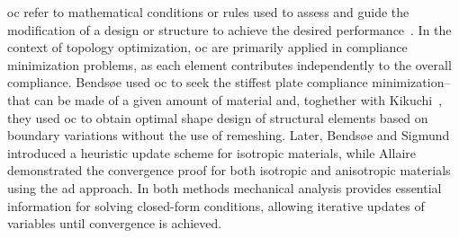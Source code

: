 \gls{oc} refer to mathematical conditions or rules used to assess and guide the modification of a design or structure to achieve the desired performance~. In the context of topology optimization, \gls{oc} are primarily applied in compliance minimization problems, as each element contributes independently to the overall compliance. Bendsøe used \gls{oc} to seek the stiffest plate \ie compliance minimization--that can be made of a given amount of material and, toghether with Kikuchi~, they used \gls{oc} to obtain optimal shape design of structural elements based on boundary variations without the use of remeshing. Later, Bendsøe and Sigmund~ introduced a heuristic update scheme for isotropic materials, while Allaire \etal~ demonstrated the convergence proof for both isotropic and anisotropic materials using the \gls{ad} approach. In both methods mechanical analysis provides essential information for solving closed-form conditions, allowing iterative updates of variables until convergence is achieved.

